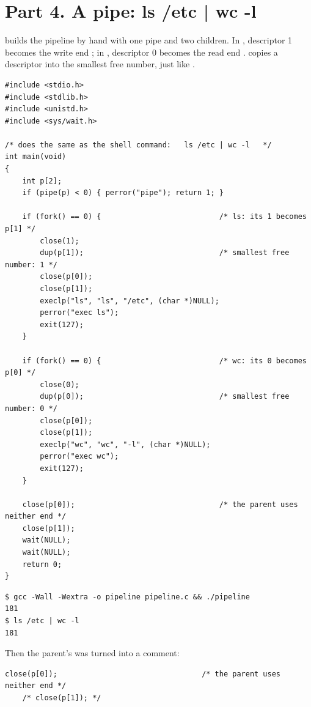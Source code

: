 \documentclass[11pt,a4paper]{article}
\begin{document}
\section{Part 4. A pipe: ls /etc | wc -l}

 builds the pipeline by hand with one pipe and two children. In ,
descriptor 1 becomes the write end ; in , descriptor 0 becomes the read end
.  copies a descriptor into the smallest free number, just like
.

\begin{lstlisting}[style=ccode,caption={pipeline.c}]
#include <stdio.h>
#include <stdlib.h>
#include <unistd.h>
#include <sys/wait.h>

/* does the same as the shell command:   ls /etc | wc -l   */
int main(void)
{
    int p[2];
    if (pipe(p) < 0) { perror("pipe"); return 1; }

    if (fork() == 0) {                           /* ls: its 1 becomes p[1] */
        close(1);
        dup(p[1]);                               /* smallest free number: 1 */
        close(p[0]);
        close(p[1]);
        execlp("ls", "ls", "/etc", (char *)NULL);
        perror("exec ls");
        exit(127);
    }

    if (fork() == 0) {                           /* wc: its 0 becomes p[0] */
        close(0);
        dup(p[0]);                               /* smallest free number: 0 */
        close(p[0]);
        close(p[1]);
        execlp("wc", "wc", "-l", (char *)NULL);
        perror("exec wc");
        exit(127);
    }

    close(p[0]);                                 /* the parent uses neither end */
    close(p[1]);
    wait(NULL);
    wait(NULL);
    return 0;
}
\end{lstlisting}

\begin{lstlisting}[caption={pipeline compared with the real shell}]
$ gcc -Wall -Wextra -o pipeline pipeline.c && ./pipeline
181
$ ls /etc | wc -l
181
\end{lstlisting}

Then the parent's  was turned into a comment:

\begin{lstlisting}[style=ccode,firstnumber=32,caption={The change that breaks the pipeline}]
    close(p[0]);                                 /* the parent uses neither end */
    /* close(p[1]); */
\end{lstlisting}
\end{document}
